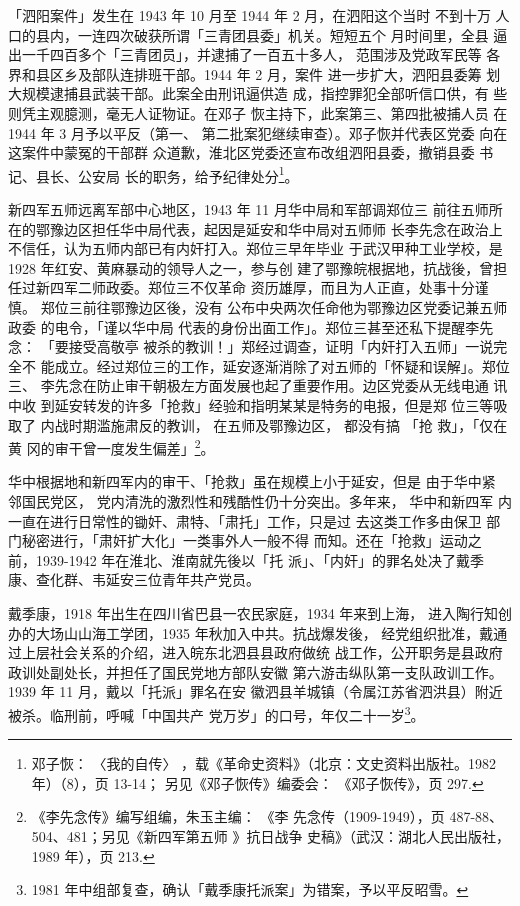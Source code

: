 「泗阳案件」发生在 1943 年 10 月至 1944 年 2 月，在泗阳这个当时 不到十万
人口的县内，一连四次破获所谓「三青团县委」机关。短短五个 月时间里，全县
逼出一千四百多个「三青团员」，并逮捕了一百五十多人， 范围涉及党政军民等
各界和县区乡及部队连排班干部。1944 年 2 月，案件 进一步扩大，泗阳县委筹
划大规模逮捕县武装干部。此案全由刑讯逼供造 成，指控罪犯全部听信口供，有
些则凭主观臆测，毫无人证物证。在邓子 恢主持下，此案第三、第四批被捕人员
在 1944 年 3 月予以平反（第一、 第二批案犯继续审查）。邓子恢并代表区党委
向在这案件中蒙冤的干部群 众道歉，淮北区党委还宣布改组泗阳县委，撤销县委
书记、县长、公安局 长的职务，给予纪律处分\footnote{邓子恢： 〈我的自传〉
，载《革命史资料》（北京：文史资料出版社。1982 年）（8），页 13-14；
另见《邓子恢传》编委会： 《邓子恢传》，页 297.  }。

新四军五师远离军部中心地区，1943 年 11 月华中局和军部调郑位三 前往五师所
在的鄂豫边区担任华中局代表，起因是延安和华中局对五师师 长李先念在政治上
不信任，认为五师内部已有内奸打入。郑位三早年毕业 于武汉甲种工业学校，是
1928 年红安、黄麻暴动的领导人之一，参与创 建了鄂豫皖根据地，抗战後，曾担
任过新四军二师政委。郑位三不仅革命 资历雄厚，而且为人正直，处事十分谨慎。
郑位三前往鄂豫边区後，没有 公布中央两次任命他为鄂豫边区党委记兼五师政委
的电令，「谨以华中局 代表的身份出面工作」。郑位三甚至还私下提醒李先念：
「要接受高敬亭 被杀的教训！」郑经过调查，证明「内奸打入五师」一说完全不
能成立。经过郑位三的工作，延安逐渐消除了对五师的「怀疑和误解」。郑位三、
李先念在防止审干朝极左方面发展也起了重要作用。边区党委从无线电通 讯中收
到延安转发的许多「抢救」经验和指明某某是特务的电报，但是郑 位三等吸取了
内战时期滥施肃反的教训， 在五师及鄂豫边区， 都没有搞 「抢 救」，「仅在黄
冈的审干曾一度发生偏差」\footnote{《李先念传》编写组编，朱玉主编： 《李
先念传（1909-1949），页 487-88、504、481；另见《新四军第五师 》抗日战争
史稿》（武汉：湖北人民出版社，1989 年），页 213.}。

华中根据地和新四军内的审干、「抢救」虽在规模上小于延安，但是 由于华中紧
邻国民党区， 党内清洗的激烈性和残酷性仍十分突出。多年来， 华中和新四军
内一直在进行日常性的锄奸、肃特、「肃托」工作，只是过 去这类工作多由保卫
部门秘密进行，「肃奸扩大化」一类事外人一般不得 而知。还在「抢救」运动之
前，1939-1942 年在淮北、淮南就先後以「托 派」、「内奸」的罪名处决了戴季
康、查化群、韦延安三位青年共产党员。

戴季康，1918 年出生在四川省巴县一农民家庭，1934 年来到上海，
进入陶行知创办的大场山山海工学团，1935 年秋加入中共。抗战爆发後，
经党组织批准，戴通过上层社会关系的介绍，进入皖东北泗县县政府做统
战工作，公开职务是县政府政训处副处长，并担任了国民党地方部队安徽
第六游击纵队第一支队政训工作。1939 年 11 月，戴以「托派」罪名在安
徽泗县羊城镇（令属江苏省泗洪县）附近被杀。临刑前，呼喊「中国共产
党万岁」的口号，年仅二十一岁\footnote{ 1981 年中组部复查，确认「戴季康托派案」为错案，予以平反昭雪。}。

